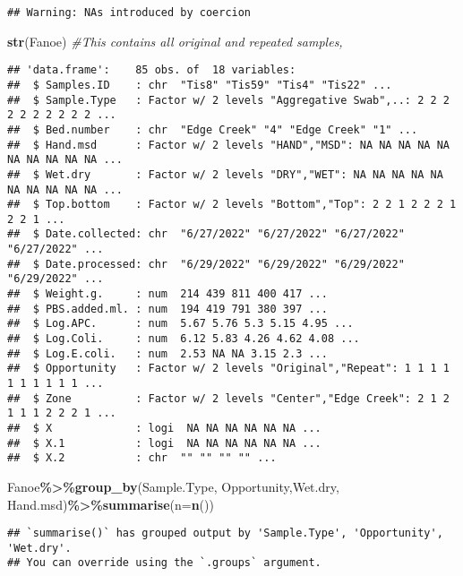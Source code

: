 \documentclass[
]{article}
\newenvironment{Shaded}{\begin{snugshade}}{\end{snugshade}}
\newcommand{\AttributeTok}[1]{\textcolor[rgb]{0.13,0.29,0.53}{#1}}
\newcommand{\CommentTok}[1]{\textcolor[rgb]{0.56,0.35,0.01}{\textit{#1}}}
\newcommand{\FunctionTok}[1]{\textcolor[rgb]{0.13,0.29,0.53}{\textbf{#1}}}
\newcommand{\NormalTok}[1]{#1}
\newcommand{\SpecialCharTok}[1]{\textcolor[rgb]{0.81,0.36,0.00}{\textbf{#1}}}
\begin{document}
\begin{verbatim}
## Warning: NAs introduced by coercion
\end{verbatim}

\begin{Shaded}
\begin{Highlighting}[]
\FunctionTok{str}\NormalTok{(Fanoe) }\CommentTok{\#This contains all original and repeated samples, }
\end{Highlighting}
\end{Shaded}

\begin{verbatim}
## 'data.frame':    85 obs. of  18 variables:
##  $ Samples.ID    : chr  "Tis8" "Tis59" "Tis4" "Tis22" ...
##  $ Sample.Type   : Factor w/ 2 levels "Aggregative Swab",..: 2 2 2 2 2 2 2 2 2 2 ...
##  $ Bed.number    : chr  "Edge Creek" "4" "Edge Creek" "1" ...
##  $ Hand.msd      : Factor w/ 2 levels "HAND","MSD": NA NA NA NA NA NA NA NA NA NA ...
##  $ Wet.dry       : Factor w/ 2 levels "DRY","WET": NA NA NA NA NA NA NA NA NA NA ...
##  $ Top.bottom    : Factor w/ 2 levels "Bottom","Top": 2 2 1 2 2 2 1 2 2 1 ...
##  $ Date.collected: chr  "6/27/2022" "6/27/2022" "6/27/2022" "6/27/2022" ...
##  $ Date.processed: chr  "6/29/2022" "6/29/2022" "6/29/2022" "6/29/2022" ...
##  $ Weight.g.     : num  214 439 811 400 417 ...
##  $ PBS.added.ml. : num  194 419 791 380 397 ...
##  $ Log.APC.      : num  5.67 5.76 5.3 5.15 4.95 ...
##  $ Log.Coli.     : num  6.12 5.83 4.26 4.62 4.08 ...
##  $ Log.E.coli.   : num  2.53 NA NA 3.15 2.3 ...
##  $ Opportunity   : Factor w/ 2 levels "Original","Repeat": 1 1 1 1 1 1 1 1 1 1 ...
##  $ Zone          : Factor w/ 2 levels "Center","Edge Creek": 2 1 2 1 1 1 2 2 2 1 ...
##  $ X             : logi  NA NA NA NA NA NA ...
##  $ X.1           : logi  NA NA NA NA NA NA ...
##  $ X.2           : chr  "" "" "" "" ...
\end{verbatim}

\begin{Shaded}
\begin{Highlighting}[]
\NormalTok{Fanoe}\SpecialCharTok{\%\textgreater{}\%}\FunctionTok{group\_by}\NormalTok{(Sample.Type, Opportunity,Wet.dry, Hand.msd)}\SpecialCharTok{\%\textgreater{}\%}\FunctionTok{summarise}\NormalTok{(}\AttributeTok{n=}\FunctionTok{n}\NormalTok{())}
\end{Highlighting}
\end{Shaded}

\begin{verbatim}
## `summarise()` has grouped output by 'Sample.Type', 'Opportunity', 'Wet.dry'.
## You can override using the `.groups` argument.
\end{verbatim}
\end{document}
